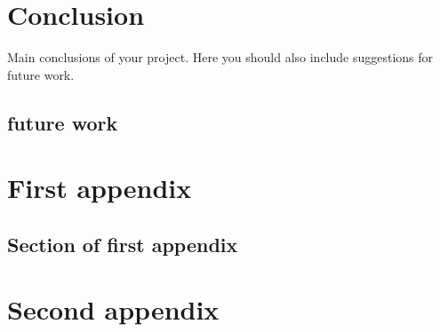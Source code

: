 \documentclass{mproj}
\begin{document}
\chapter{Conclusion}\label{conclusion}

Main conclusions of your project. Here you should also include suggestions for future work.

\section{future work}


\appendix %
\chapter{First appendix}

\section{Section of first appendix}

\chapter{Second appendix}



\end{document}
